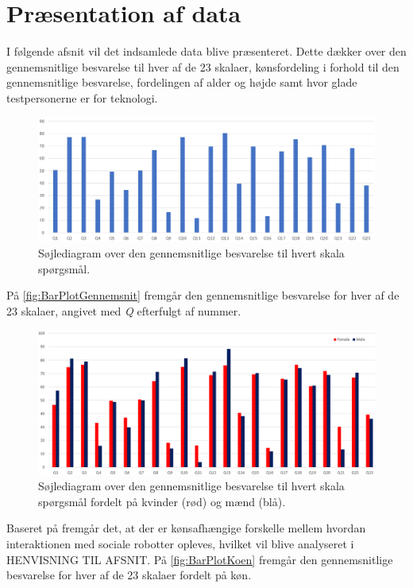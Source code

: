 \section{Præsentation af data}
\label{TestAfSkalaPraesentationAfData}
%
I følgende afsnit vil det indsamlede data blive præsenteret. Dette dækker over den gennemsnitlige besvarelse til hver af de 23 skalaer, kønsfordeling i forhold til den gennemsnitlige besvarelse, fordelingen af alder og højde samt hvor glade testpersonerne er for teknologi. 
%
\begin{figure}[H]
\centering
\includegraphics[width = \textwidth]{Figure/DatabehandlingSkalaer/BarPlotRaaData} 
\caption{Søjlediagram over den gennemsnitlige besvarelse til hvert skala spørgsmål.}
\label{fig:BarPlotGennemsnit}
\end{figure}
\noindent
%
På \autoref{fig:BarPlotGennemsnit} fremgår den gennemsnitlige besvarelse for hver af de 23 skalaer, angivet med \textit{Q} efterfulgt af nummer.
%
\begin{figure}[H]
\centering
\includegraphics[width = \textwidth]{Figure/DatabehandlingSkalaer/KoenGennemnitligBesvarelser} 
\caption{Søjlediagram over den gennemsnitlige besvarelse til hvert skala spørgsmål fordelt på kvinder (rød) og mænd (blå).}
\label{fig:BarPlotKoen}
\end{figure}
\noindent
%
Baseret på  fremgår det, at der er kønsafhængige forskelle mellem hvordan interaktionen med sociale robotter opleves, hvilket vil blive analyseret i HENVISNING TIL AFSNIT. På \autoref{fig:BarPlotKoen} fremgår den gennemsnitlige besvarelse for hver af de 23 skalaer fordelt på køn.    
